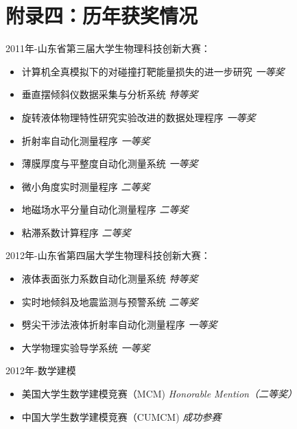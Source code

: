\documentclass[UTF8,a4paper,12pt]{article}
\begin{document}
\section{附录四：历年获奖情况}
\noindent 2011年-山东省第三届大学生物理科技创新大赛：
\begin{itemize}
\item 计算机全真模拟下的对碰撞打靶能量损失的进一步研究 \hfill \emph{一等奖}
\item 垂直摆倾斜仪数据采集与分析系统 \hfill \emph{特等奖}
\item 旋转液体物理特性研究实验改进的数据处理程序 \hfill \emph{一等奖}
\item 折射率自动化测量程序 \hfill \emph{一等奖}
\item 薄膜厚度与平整度自动化测量系统 \hfill \emph{一等奖}
\item 微小角度实时测量程序 \hfill \emph{二等奖}
\item 地磁场水平分量自动化测量程序 \hfill \emph{二等奖}
\item 粘滞系数计算程序 \hfill \emph{二等奖}
\end{itemize}

\noindent 2012年-山东省第四届大学生物理科技创新大赛：
\begin{itemize}
\item 液体表面张力系数自动化测量系统 \hfill \emph{特等奖}
\item 实时地倾斜及地震监测与预警系统 \hfill \emph{二等奖}
\item 劈尖干涉法液体折射率自动化测量程序 \hfill \emph{一等奖}
\item 大学物理实验导学系统 \hfill \emph{一等奖}
\end{itemize}

\noindent 2012年-数学建模
\begin{itemize}
\item 美国大学生数学建模竞赛（MCM) \hfill \emph{Honorable Mention（二等奖）}
\item 中国大学生数学建模竞赛（CUMCM) \hfill \emph{成功参赛}
\end{itemize}
\end{document}

